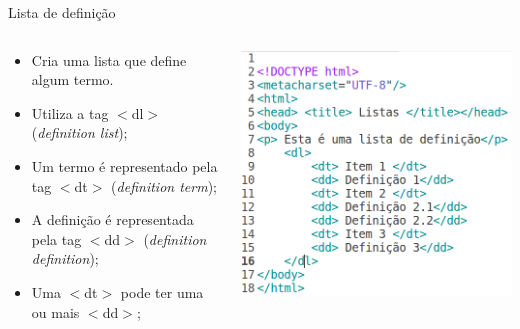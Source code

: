 \documentclass{beamer}
\begin{document}
\begin{frame}{Lista de definição}
  \begin{columns}
    \begin{column}{0.45 \textwidth}
     \begin{itemize}
      \item Cria uma lista que define algum termo.
       \item Utiliza a tag $<$dl$>$ (\textit{definition list});
       \item Um termo é representado pela tag $<$dt$>$ 
(\textit{definition term});
       \item A definição é representada pela tag $<$dd$>$ 
      (\textit{definition definition});
       \item Uma $<$dt$>$ pode ter uma ou mais $<$dd$>$;
     \end{itemize}
    \end{column}
    \begin{column}{0.5\textwidth}
     \includegraphics[height=0.55\paperheight]{fig/aula2/html4.png}
    \end{column}
  \end{columns}
\end{frame}
\end{document}
